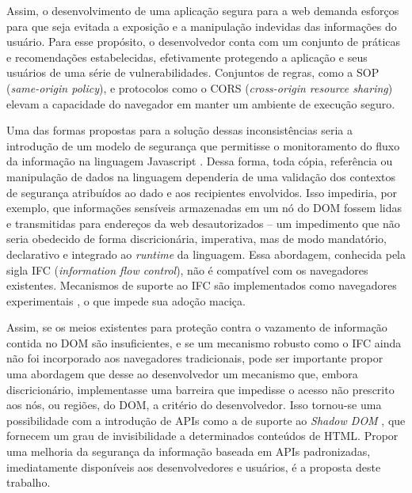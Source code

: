 Assim, o desenvolvimento de uma aplicação segura para a web demanda esforços para que seja evitada a exposição e a manipulação indevidas das informações do usuário. Para esse propósito, o desenvolvedor conta com um conjunto de práticas e recomendações estabelecidas, efetivamente protegendo a aplicação e seus usuários de uma série de vulnerabilidades. Conjuntos de regras, como a SOP (\textit{same-origin policy}), e protocolos como o CORS (\textit{cross-origin resource sharing}) elevam a capacidade do navegador em manter um ambiente de execução seguro.%


Uma das formas propostas para a solução dessas inconsistências seria a introdução de um modelo de segurança que permitisse o monitoramento do fluxo da informação na linguagem Javascript \cite[p.3]{Heule2015_IFC_Inside}. Dessa forma, toda cópia, referência ou manipulação de dados na linguagem dependeria de uma validação dos contextos de segurança atribuídos ao dado e aos recipientes envolvidos. Isso impediria, por exemplo, que informações sensíveis armazenadas em um nó do DOM fossem lidas e transmitidas para endereços da web desautorizados -- um impedimento que não seria obedecido de forma discricionária, imperativa, mas de modo mandatório, declarativo e integrado ao \textit{runtime} da linguagem. Essa abordagem, conhecida pela sigla IFC (\textit{information flow control}), não é compatível com os navegadores existentes. Mecanismos de suporte ao IFC são implementados como navegadores experimentais \cite{Hedin2014, Bichhawat2014}, o que impede sua adoção maciça.

Assim, se os meios existentes para proteção contra o vazamento de informação contida no DOM são insuficientes, e se um mecanismo robusto como o IFC ainda não foi incorporado aos navegadores tradicionais, pode ser importante propor uma abordagem que desse ao desenvolvedor um mecanismo que, embora discricionário, implementasse uma barreira que impedisse o acesso não prescrito aos nós, ou regiões, do DOM, a critério do desenvolvedor. Isso tornou-se uma possibilidade com a introdução de APIs como a de suporte ao \textit{Shadow DOM} \cite{W3C:ShadowDOM}, que fornecem um grau de invisibilidade a determinados conteúdos de HTML. Propor uma melhoria da segurança da informação baseada em APIs padronizadas, imediatamente disponíveis aos desenvolvedores e usuários, é a proposta deste trabalho.